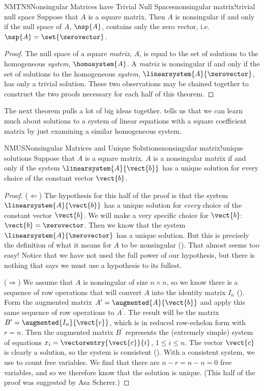%
\begin{theorem}{NMTNS}{Nonsingular Matrices have Trivial Null Spaces}{nonsingular matrix!trivial null space}
Suppose that $A$ is a square matrix.  Then $A$ is nonsingular if and only if the null space of $A$, $\nsp{A}$, contains only the zero vector, i.e.\ $\nsp{A}=\set{\zerovector}$.
\end{theorem}
%
\begin{proof}
The null space of a square {\em matrix}, $A$, is equal to the set of solutions to the homogeneous {\em system}, $\homosystem{A}$.  A {\em matrix} is nonsingular if and only if the set of solutions to the homogeneous {\em system}, $\linearsystem{A}{\zerovector}$, has only a trivial solution.  These two observations may be chained together to construct the two proofs necessary for each half of this theorem.
\end{proof}
%
The next theorem pulls a lot of big ideas together.
 tells us that we can learn much about solutions to a system of linear equations with a square coefficient matrix by just examining a similar homogeneous system.
%
\begin{theorem}{NMUS}{Nonsingular Matrices and Unique Solutions}{nonsingular matrix!unique solutions}
Suppose that $A$ is a square matrix.  $A$ is a nonsingular matrix if and only if the system $\linearsystem{A}{\vect{b}}$ has a unique solution for every choice of the constant vector $\vect{b}$.
\end{theorem}
%
\begin{proof}
($\Leftarrow$)  The hypothesis for this half of the proof is that the system $\linearsystem{A}{\vect{b}}$ has a unique solution for {\em every} choice of the constant vector $\vect{b}$.  We will make a very specific choice for $\vect{b}$:  $\vect{b}=\zerovector$.  Then we know that the system $\linearsystem{A}{\zerovector}$ has a unique solution.  But this is precisely the definition of what it means for $A$ to be nonsingular ().  That almost seems too easy!  Notice that we have not used the full power of our hypothesis, but there is nothing that says we must use a hypothesis to its fullest.\par
%
($\Rightarrow$)  We assume that $A$ is nonsingular of size $n\times n$, so we know there is a sequence of row operations that will convert $A$ into the identity matrix $I_n$ ().  Form the augmented matrix $A^\prime=\augmented{A}{\vect{b}}$ and apply this same sequence of row operations to $A^\prime$.  The result will be the matrix $B^\prime=\augmented{I_n}{\vect{c}}$, which is in reduced row-echelon form with $r=n$.  Then the augmented matrix $B^\prime$ represents the (extremely simple) system of equations $x_i=\vectorentry{\vect{c}}{i}$, $1\leq i\leq n$.  The vector $\vect{c}$ is clearly a solution, so the system is consistent ().  With a consistent system, we use  to count free variables.  We find that there are $n-r=n-n=0$ free variables, and so we therefore know that the solution is unique.  (This half of the proof was suggested by Asa Scherer.)\par
%
\end{proof}
